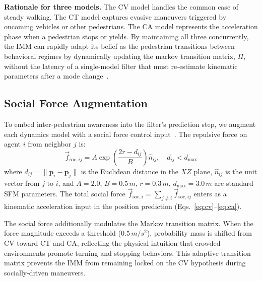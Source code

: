 \documentclass[conference]{IEEEtran}
\begin{document}
\textbf{Rationale for three models.}
The CV model handles the common case of steady walking. The CT model captures evasive maneuvers triggered by oncoming vehicles or other pedestrians. The CA model represents the acceleration phase when a pedestrian stops or yields. By maintaining all three concurrently, the IMM can rapidly adapt its belief as the pedestrian transitions between behavioral regimes by dynamically updating the markov transition matrix, $\Pi$, without the latency of a single-model filter that must re-estimate kinematic parameters after a mode change~\cite{li2005survey}.

\subsection{Social Force Augmentation}
\label{sec:socialforce}

To embed inter-pedestrian awareness into the filter's prediction step, we augment each dynamics model with a social force control input~\cite{helbing1995social}. The repulsive force on agent $i$ from neighbor $j$ is:
\begin{equation}
\label{eq:sf}
\vec{f}_{\text{soc},ij} = A \exp\!\left(\frac{2r - d_{ij}}{B}\right) \hat{n}_{ij}, \quad d_{ij} < d_{\max}
\end{equation}
where $d_{ij} = \|\mathbf{p}_i - \mathbf{p}_j\|$ is the Euclidean distance in the $XZ$ plane, $\hat{n}_{ij}$ is the unit vector from $j$ to $i$, and $A = 2.0$, $B = 0.5\,\si{m}$, $r = 0.3\,\si{m}$, $d_{\max} = 3.0\,\si{m}$ are standard SFM parameters. The total social force $\vec{f}_{\text{soc},i} = \sum_{j \neq i} \vec{f}_{\text{soc},ij}$ enters as a kinematic acceleration input in the position prediction (Eqs.~\ref{eq:cv}--\ref{eq:ca}).

The social force additionally modulates the Markov transition matrix. When the force magnitude exceeds a threshold ($0.5\,\si{m/s^2}$), probability mass is shifted from CV toward CT and CA, reflecting the physical intuition that crowded environments promote turning and stopping behaviors. This adaptive transition matrix prevents the IMM from remaining locked on the CV hypothesis during socially-driven maneuvers.

\end{document}
